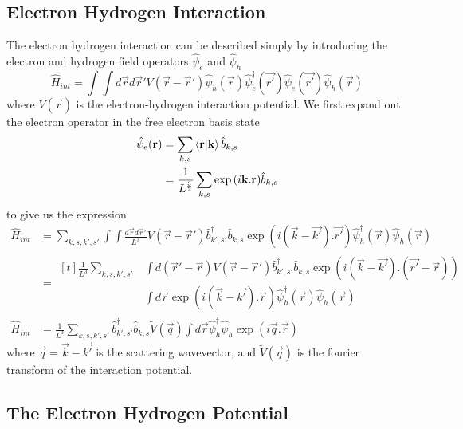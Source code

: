 \subsection{Electron Hydrogen Interaction}
The electron hydrogen interaction can
be described simply by introducing
the electron and hydrogen field
operators \(\hat{\psi}_e\) and
\(\hat{\psi}_h\)~\cite{nazarov_danon_2013}
\begin{equation}
  \hat{H}_{int} = \int\int{d\vec{r} d\vec{r}'
    V(\vec{r}-\vec{r}')
    \hat{\psi}^\dagger_h(\vec{r})
    \hat{\psi}^\dagger_e(\vec{r'})
    \hat{\psi}_e(\vec{r'})
    \hat{\psi}_h(\vec{r})}
\end{equation}
where \(V(\vec{r})\) is
the electron-hydrogen
interaction potential.
We first expand out the
electron operator in
the free electron basis state
\begin{align}
  \hat{\psi}_e(\mathbf{r}) & = \sum_{k, s}
  \braket{\mathbf{r}|\mathbf{k}}
  \hat{b}_{k, s}                                      \\
                        & = \frac{1}{L^{\frac{3}{2}}}
  \sum_{k, s} \exp{(i\mathbf{k}.\mathbf{r})}
  \hat{b}_{k, s}
\end{align}
to give us the expression
\begin{align}
  \hat{H}_{int} & =
  \sum_{k, s, k', s'} \int\int{\frac{d\vec{r} d\vec{r}'}{L^3}
    V(\vec{r}-\vec{r}')
    \hat{b}^\dagger_{k',s'}
    \hat{b}_{k, s}
    \exp{(i(\vec{k} - \vec{k'}).\vec{r'})}
    \hat{\psi}^\dagger_h(\vec{r})
  \hat{\psi}_h(\vec{r})}                       \\
                & = \begin{aligned}[t]
    \frac{1}{L^3}
    \sum_{k, s, k', s'}
     & \int d(\vec{r}' - \vec{r})
    V(\vec{r}-\vec{r}')
    \hat{b}^\dagger_{k',s'}
    \hat{b}_{k, s}
    \exp{(i(\vec{k} - \vec{k'}).(\vec{r'} - \vec{r}))} \\
     & \int d\vec{r}
    \exp{(i(\vec{k} - \vec{k'}).\vec{r})}
    \hat{\psi}^\dagger_h(\vec{r})
    \hat{\psi}_h(\vec{r})
  \end{aligned} \\
  \hat{H}_{int} & = \frac{1}{L^3}
  \sum_{k,s,k',s'}
  \hat{b}^\dagger_{k',s'}\hat{b}_{k,s}
  \tilde{V}(\vec{q})\int{d\vec{r}
  \hat{\psi}_h^{\dagger}\hat{\psi}_h
  \exp(i\vec{q}.\vec{r})}
\end{align}
where \(\vec{q} = \vec{k} - \vec{k'}\)
is the scattering wavevector, and
\(\tilde{V}(\vec{q})\) is the
fourier transform of the interaction
potential.


\subsection{The Electron Hydrogen Potential}

